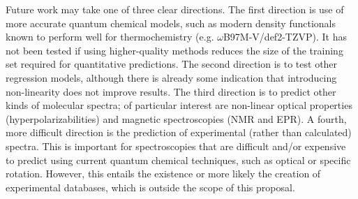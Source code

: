 \documentclass[11pt]{article}
\begin{document}
Future work may take one of three clear directions. The first direction is use of more accurate quantum chemical models, such as modern density functionals known to perform well for thermochemistry (e.g. \(\omega\)B97M-V/def2-TZVP). It has not been tested if using higher-quality methods reduces the size of the training set required for quantitative predictions. The second direction is to test other regression models, although there is already some indication that introducing non-linearity does not improve results. The third direction is to predict other kinds of molecular spectra; of particular interest are non-linear optical properties (hyperpolarizabilities) and magnetic spectroscopies (NMR and EPR). A fourth, more difficult direction is the prediction of experimental (rather than calculated) spectra. This is important for spectroscopies that are difficult and/or expensive to predict using current quantum chemical techniques, such as optical or specific rotation. However, this entails the existence or more likely the creation of experimental databases, which is outside the scope of this proposal.
\end{document}
